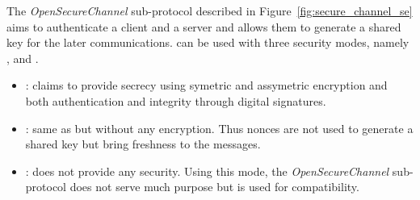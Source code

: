 \newcommand{\gereq}{GEReq}
\newcommand{\geres}{GERes}
\newcommand{\oscreq}{OSCReq}
\newcommand{\oscres}{OSCRes}


The {\em OpenSecureChannel} sub-protocol described in
Figure~\ref{fig:secure_channel_se} aims to authenticate a client and
a server and allows them to generate a shared key for the later communications.
\opcua can be used with three security modes, namely {\em \smn}, {\em \sms} and
{\em \smse}.

\begin{itemize}
    \item \smse: claims to provide secrecy using symetric and
      assymetric encryption and both authentication and integrity
      through digital signatures.
    \item \sms: same as {\em \smse} but without any encryption.  Thus
      nonces are not used to generate a shared key but bring freshness
      to the messages.
    \item \smn: does not provide any security.  Using this mode, the
      {\em OpenSecureChannel} sub-protocol does not serve much
      purpose but is used for compatibility.
\end{itemize}

